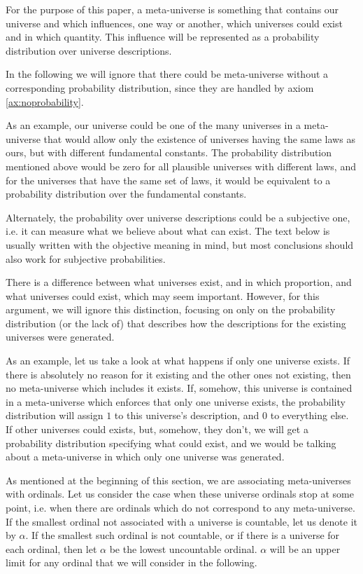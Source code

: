 \documentclass[a4paper
,draft
]{article}
\begin{document}
For the purpose of this paper, a meta-universe is something that contains our
universe and which influences, one way or another, which universes could
exist and in which quantity.
This influence will be represented as a probability
distribution over universe descriptions.

In the following we will ignore that there could be meta-universe without
a corresponding probability distribution, since they are handled by axiom
\ref{ax:noprobability}.

As an example, our universe could be one of the many universes in a
meta-universe that would allow only the existence of universes having the
same laws as ours, but with different fundamental constants.
The probability distribution mentioned above would be zero for all
plausible universes with different laws, and for the universes that have
the same set of laws, it would be equivalent to a
probability distribution over the fundamental constants.

Alternately, the probability over universe descriptions could be a
subjective one, i.e. it can measure what we believe about what can exist.
The text below is usually written with the objective meaning in mind, but
most conclusions should also work for subjective probabilities.

There is a difference between what universes exist, and in which proportion,
and what universes could exist, which may seem important.
However, for this argument, we will ignore this distinction, focusing on
only on the probability distribution (or the lack of) that describes
how the descriptions for the existing universes were generated.

As an example, let us take a look at what happens if only one universe exists.
If there is absolutely no reason
for it existing and the other ones not existing, then no meta-universe which
includes it exists.
If, somehow, this universe is contained in a meta-universe which
enforces that only one universe exists, the probability distribution will
assign $1$ to this universe's description, and $0$ to everything else.
If other universes could exists, but, somehow, they don't, we will get a
probability distribution specifying what could exist, and we would be talking
about a meta-universe in which only one universe was generated.

As mentioned at the beginning of this section, we are associating
meta-universes with ordinals. Let us consider the case
when these universe ordinals stop at some point, i.e. when there are ordinals
which do not correspond to any meta-universe.
If the smallest
ordinal not associated with a universe is countable, let us denote it by
$\alpha$.
If the smallest such ordinal is not countable,
or if there is a universe for each ordinal,
then let $\alpha$ be the lowest uncountable ordinal. $\alpha$ will
be an upper limit for any ordinal that we will consider in the following.
\end{document}
